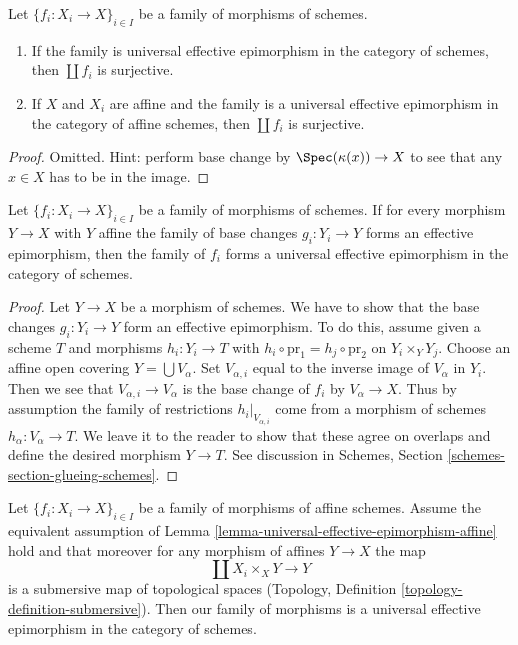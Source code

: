 \begin{lemma}
\label{lemma-universal-effective-epimorphism-surjective}
Let $\{f_i : X_i \to X\}_{i \in I}$ be a family of morphisms of schemes.
\begin{enumerate}
\item If the family is universal effective
epimorphism in the category of schemes, then $\coprod f_i$ is surjective.
\item If $X$ and $X_i$ are affine and the family is a universal effective
epimorphism in the category of affine schemes, then
$\coprod f_i$ is surjective.
\end{enumerate}
\end{lemma}

\begin{proof}
Omitted. Hint: perform base change by $\Spec(\kappa(x)) \to X$
to see that any $x \in X$ has to be in the image.
\end{proof}

\begin{lemma}
\label{lemma-check-universal-effective-epimorphism-affine}
Let $\{f_i : X_i \to X\}_{i \in I}$ be a family of morphisms of schemes.
If for every morphism $Y \to X$ with $Y$ affine the family of base changes
$g_i : Y_i \to Y$ forms an effective epimorphism, then
the family of $f_i$ forms a universal effective epimorphism
in the category of schemes.
\end{lemma}

\begin{proof}
Let $Y \to X$ be a morphism of schemes. We have to show that
the base changes $g_i : Y_i \to Y$ form an effective epimorphism.
To do this, assume given a scheme $T$ and morphisms $h_i : Y_i \to T$
with $h_i \circ \text{pr}_1 = h_j \circ \text{pr}_2$ on
$Y_i \times_Y Y_j$.
Choose an affine open covering $Y = \bigcup V_\alpha$.
Set $V_{\alpha, i}$ equal to the inverse image of
$V_\alpha$ in $Y_i$. Then we see that
$V_{\alpha, i}  \to V_\alpha$ is the base change of
$f_i$ by $V_\alpha \to X$. Thus by assumption
the family of restrictions $h_i|_{V_{\alpha, i}}$
come from a morphism of schemes $h_\alpha : V_\alpha \to T$.
We leave it to the reader to show that these agree
on overlaps and define the desired morphism $Y \to T$.
See discussion in Schemes, Section \ref{schemes-section-glueing-schemes}.
\end{proof}

\begin{lemma}
\label{lemma-universal-effective-epimorphism}
Let $\{f_i : X_i \to X\}_{i \in I}$ be a family of morphisms of affine
schemes. Assume the equivalent assumption of
Lemma \ref{lemma-universal-effective-epimorphism-affine} hold
and that moreover for any morphism of affines $Y \to X$ the map
$$
\coprod X_i \times_X Y \longrightarrow Y
$$
is a submersive map of topological spaces
(Topology, Definition \ref{topology-definition-submersive}).
Then our family of morphisms is a universal effective epimorphism
in the category of schemes.
\end{lemma}

